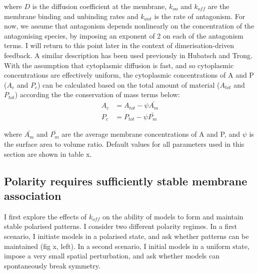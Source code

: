 \documentclass[12pt]{"report"}
\begin{document}
where $D$ is the diffusion coefficient at the membrane, $k_{on}$ and $k_{off}$ are the membrane binding and unbinding rates and $k_{ant}$ is the rate of antagonism. For now, we assume that antagonism depends nonlinearly on the concentration of the antagonising species, by imposing an exponent of 2 on each of the antagonism terms. I will return to this point later in the context of dimerisation-driven feedback. A similar description has been used previously in Hubatsch and Trong. With the assumption that cytoplasmic diffusion is fast, and so cytoplasmic concentrations are effectively uniform, the cytoplasmic concentrations of A and P ($A_c$ and $P_c$) can be calculated based on the total amount of material ($A_{tot}$ and $P_{tot}$) according the the conservation of mass terms below:
\begin{align}
A_c &= A_{tot} - \psi \bar{A_m}\\
P_c &= P_{tot} - \psi \bar{P_m}
\end{align}

where $\bar{A_m}$ and $\bar{P_m}$ are the average membrane concentrations of A and P, and $\psi$ is the surface area to volume ratio. Default values for all parameters used in this section are shown in table x.



\clearpage
\subsection{Polarity requires sufficiently stable membrane association}


I first explore the effects of $k_{off}$ on the ability of models to form and maintain stable polarised patterns. I consider two different polarity regimes. In a first scenario, I initiate models in a polarised state, and ask whether patterns can be maintained (fig x, left). In a second scenario, I initial models in a uniform state, impose a very small spatial perturbation, and ask whether models can spontaneously break symmetry.\\
\end{document}
